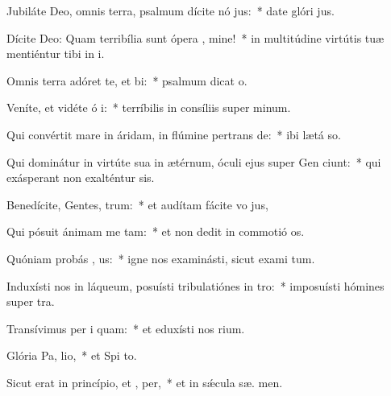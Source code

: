 \item Jubiláte Deo, omnis terra, psalmum dícite nó jus:~* date glóri  jus.
\item Dícite Deo: Quam terribília sunt ópera , mine!~* in multitúdine virtútis tuæ mentiéntur tibi in i.
\item Omnis terra adóret te, et  bi:~* psalmum dicat  o.
\item Veníte, et vidéte ó i:~* terríbilis in consíliis super  minum.
\item Qui convértit mare in áridam, in flúmine pertrans de:~* ibi lætá  so.
\item Qui dominátur in virtúte sua in ætérnum, óculi ejus super Gen ciunt:~* qui exásperant non exalténtur  sis.
\item Benedícite, Gentes,  trum:~* et audítam fácite vo  jus,
\item Qui pósuit ánimam me  tam:~* et non dedit in commotió  os.
\item Quóniam probás , us:~* igne nos examinásti, sicut exami tum.
\item Induxísti nos in láqueum, posuísti tribulatiónes in  tro:~* imposuísti hómines super  tra.
\item Transívimus per i  quam:~* et eduxísti nos  rium.
\item Glória Pa,  lio,~* et Spi to.
\item Sicut erat in princípio, et ,  per,~* et in sǽcula sæ. men.
